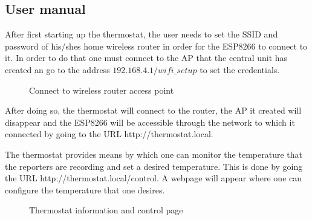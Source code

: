 \subsection{User manual}

\qquad After first starting up the thermostat, the user needs to set the SSID and password of his/shes home wireless
router in order for the ESP8266 to connect to it. In order to do that one must connect to the AP that the
central unit has created an go to the address $192.168.4.1/wifi\_setup$ to set the credentials.

\begin{figure}[h!]
    \label{fig:connect_ap}
    \centerline{}
    \caption[Connect to wireless router access point]{Connect to wireless router access point}
    \label{fig:connect_ap}
\end{figure}

After doing so, the thermostat will connect to the router, the AP it created will disappear and the ESP8266
will be accessible through the network to which it connected by going to the URL http://thermostat.local.

The thermostat provides means by which one can monitor the temperature that the reporters are recording and
set a desired temperature. This is done by going the URL http://thermostat.local/control. A webpage will
appear where one can configure the temperature that one desires.

\begin{figure}[h!]
    \label{fig:control}
    \centerline{}
    \caption[Thermostat information and control page]{Thermostat information and control page}
    \label{fig:control}
\end{figure}

